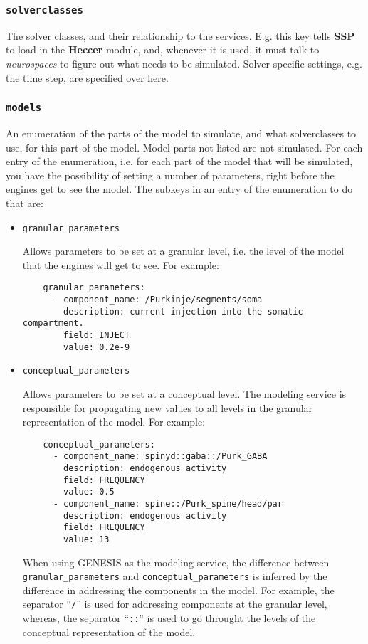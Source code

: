 \documentclass[12pt]{article}
\begin{document}
\subsubsection*{\tt solverclasses}

    The solver classes, and their relationship to the services. E.g. this key tells {\bf SSP} to load in the {\bf Heccer} module, and, whenever it is used, it must talk to {\it neurospaces} to figure out what needs to be simulated. Solver specific settings, e.g. the time step, are specified over here. 

\subsubsection*{\tt models}

    An enumeration of the parts of the model to simulate, and what solverclasses to use, for this part of the model. Model parts not listed are not simulated. For each entry of the enumeration, i.e. for each part of the model that will be simulated, you have the possibility of setting a number of parameters, right before the engines get to see the model. The subkeys in an entry of the enumeration to do that are: 

\begin{itemize}

\item[ ] {\tt granular\_parameters}

Allows parameters to be set at a granular level, i.e. the level of the model that the engines will get to see. For example: 

\begin{verbatim}
    granular_parameters:
      - component_name: /Purkinje/segments/soma
        description: current injection into the somatic compartment.
        field: INJECT
        value: 0.2e-9
\end{verbatim}

\item[ ]{\tt conceptual\_parameters}

Allows parameters to be set at a conceptual level. The modeling service is responsible for propagating new values to all levels in the granular representation of the model. For example:

\begin{verbatim}
    conceptual_parameters:
      - component_name: spinyd::gaba::/Purk_GABA
        description: endogenous activity
        field: FREQUENCY
        value: 0.5
      - component_name: spine::/Purk_spine/head/par
        description: endogenous activity
        field: FREQUENCY
        value: 13
\end{verbatim}
When using GENESIS as the modeling service, the difference between {\tt granular\_parameters} and {\tt conceptual\_parameters} is inferred by the difference in addressing the components in the model. For example, the separator ``{\tt /}'' is used for addressing components at the granular level, whereas, the separator ``{\tt ::}'' is used to go throught the levels of the conceptual representation of the model.

\end{itemize}
\end{document}
